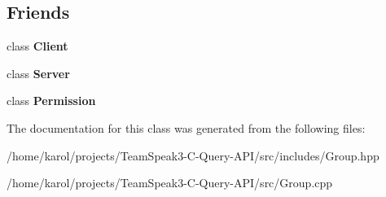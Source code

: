 \subsection*{Friends}
\begin{DoxyCompactItemize}
\item 
class {\bfseries Client}\hypertarget{class_ts3_api_1_1_group_a5db1c99e2c94b26278f3838c85cdb618}{}\label{class_ts3_api_1_1_group_a5db1c99e2c94b26278f3838c85cdb618}

\item 
class {\bfseries Server}\hypertarget{class_ts3_api_1_1_group_ac2055578ac48afabe5af487878450f68}{}\label{class_ts3_api_1_1_group_ac2055578ac48afabe5af487878450f68}

\item 
class {\bfseries Permission}\hypertarget{class_ts3_api_1_1_group_ad3834bbd6b2c4839e7f69dc4cc1d6ae6}{}\label{class_ts3_api_1_1_group_ad3834bbd6b2c4839e7f69dc4cc1d6ae6}

\end{DoxyCompactItemize}


The documentation for this class was generated from the following files\+:\begin{DoxyCompactItemize}
\item 
/home/karol/projects/\+Team\+Speak3-\/\+C-\/\+Query-\/\+A\+P\+I/src/includes/Group.\+hpp\item 
/home/karol/projects/\+Team\+Speak3-\/\+C-\/\+Query-\/\+A\+P\+I/src/Group.\+cpp\end{DoxyCompactItemize}
